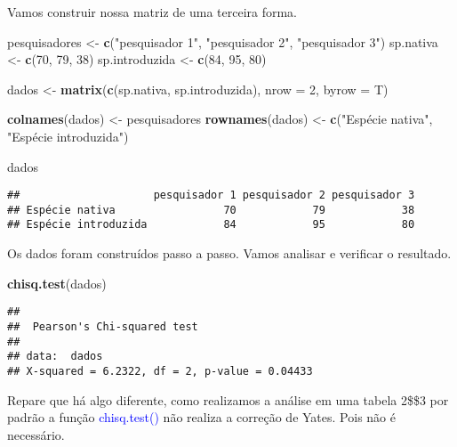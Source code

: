 \documentclass[14pt,titlepage, oneside, openany, a4paper]{book}
\newenvironment{Shaded}{\begin{snugshade}}{\end{snugshade}}
\newcommand{\DataTypeTok}[1]{\textcolor[rgb]{0.13,0.29,0.53}{#1}}
\newcommand{\DecValTok}[1]{\textcolor[rgb]{0.00,0.00,0.81}{#1}}
\newcommand{\KeywordTok}[1]{\textcolor[rgb]{0.13,0.29,0.53}{\textbf{#1}}}
\newcommand{\NormalTok}[1]{#1}
\newcommand{\StringTok}[1]{\textcolor[rgb]{0.31,0.60,0.02}{#1}}
\begin{document}
Vamos construir nossa matriz de uma terceira forma.

\begin{Shaded}
\begin{Highlighting}[]
\NormalTok{pesquisadores <-}\StringTok{ }\KeywordTok{c}\NormalTok{(}\StringTok{"pesquisador 1"}\NormalTok{, }\StringTok{"pesquisador 2"}\NormalTok{, }\StringTok{"pesquisador 3"}\NormalTok{)}
\NormalTok{sp.nativa <-}\StringTok{ }\KeywordTok{c}\NormalTok{(}\DecValTok{70}\NormalTok{, }\DecValTok{79}\NormalTok{, }\DecValTok{38}\NormalTok{)}
\NormalTok{sp.introduzida <-}\StringTok{ }\KeywordTok{c}\NormalTok{(}\DecValTok{84}\NormalTok{, }\DecValTok{95}\NormalTok{, }\DecValTok{80}\NormalTok{)}

\NormalTok{dados <-}\StringTok{ }\KeywordTok{matrix}\NormalTok{(}\KeywordTok{c}\NormalTok{(sp.nativa, sp.introduzida), }\DataTypeTok{nrow =} \DecValTok{2}\NormalTok{, }\DataTypeTok{byrow =}\NormalTok{ T)}

\KeywordTok{colnames}\NormalTok{(dados) <-}\StringTok{ }\NormalTok{pesquisadores}
\KeywordTok{rownames}\NormalTok{(dados) <-}\StringTok{ }\KeywordTok{c}\NormalTok{(}\StringTok{"Espécie nativa"}\NormalTok{, }\StringTok{"Espécie introduzida"}\NormalTok{)}

\NormalTok{dados}
\end{Highlighting}
\end{Shaded}

\begin{verbatim}
##                     pesquisador 1 pesquisador 2 pesquisador 3
## Espécie nativa                 70            79            38
## Espécie introduzida            84            95            80
\end{verbatim}

Os dados foram construídos passo a passo. Vamos analisar e verificar o resultado.

\begin{Shaded}
\begin{Highlighting}[]
\KeywordTok{chisq.test}\NormalTok{(dados)}
\end{Highlighting}
\end{Shaded}

\begin{verbatim}
## 
##  Pearson's Chi-squared test
## 
## data:  dados
## X-squared = 6.2322, df = 2, p-value = 0.04433
\end{verbatim}

Repare que há algo diferente, como realizamos a análise em uma tabela 2\$\times\$3 por padrão a função \textcolor{blue}{chisq.test()} não realiza a correção de Yates. Pois não é necessário.
\end{document}
